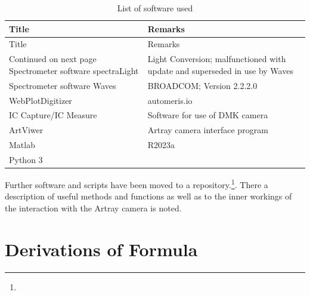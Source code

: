 \documentclass[twoside,openright,listof=numbered]{scrreprt}
\begin{document}
\begin{longtable}{p{}p{}}
    \caption{List of software used}
    \label{tab:software} \\
    \toprule 
    Title & Remarks \\
    \midrule
    \endfirsthead
    \toprule 
    Title & Remarks \\
    \midrule
    \endhead
    \midrule
    Continued on next page
    \endfoot
    \bottomrule
    \endlastfoot
    Spectrometer software spectraLight & Light Conversion; malfunctioned with update and superseded in use by Waves \\
    Spectrometer software Waves & BROADCOM; Version 2.2.2.0\\
    WebPlotDigitizer & automeris.io\\
    IC Capture/IC Measure & Software for use of DMK camera\\
    ArtViwer & Artray camera interface program\\
    Matlab & R2023a\\
    Python 3& \\
    
\end{longtable}
Further software and scripts have been moved to a repository.\footnote{}. There a description of useful methods and functions as well as to the inner workings of the interaction with the Artray camera is noted.

\listoffigures
\listoftables

\chapter{Derivations of Formula}
\end{document}
